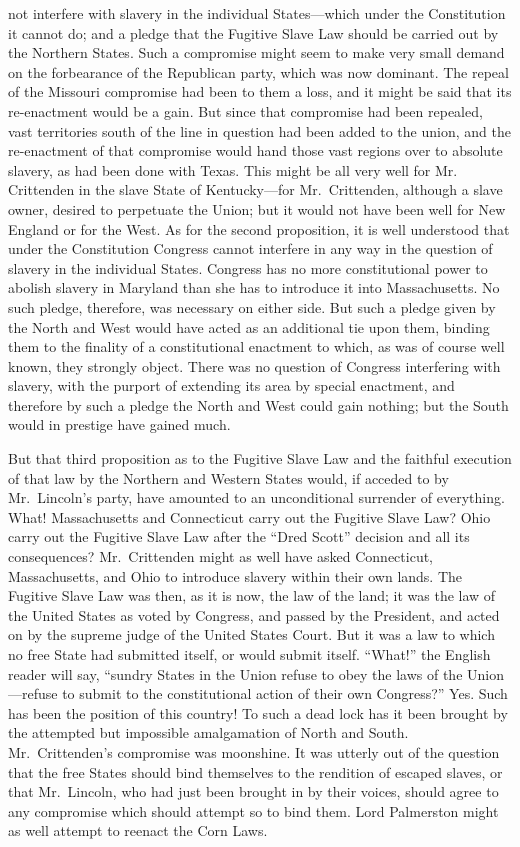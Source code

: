 not interfere with slavery in the individual States---which under
the Constitution it cannot do; and a pledge that the Fugitive Slave
Law should be carried out by the Northern States.  Such a
compromise might seem to make very small demand on the forbearance
of the Republican party, which was now dominant.  The repeal of the
Missouri compromise had been to them a loss, and it might be said
that its re-enactment would be a gain.  But since that compromise
had been repealed, vast territories south of the line in question
had been added to the union, and the re-enactment of that
compromise would hand those vast regions over to absolute slavery,
as had been done with Texas.  This might be all very well for Mr.\ %
Crittenden in the slave State of Kentucky---for Mr.\ Crittenden,
although a slave owner, desired to perpetuate the Union; but it
would not have been well for New England or for the West.  As for
the second proposition, it is well understood that under the
Constitution Congress cannot interfere in any way in the question
of slavery in the individual States.  Congress has no more
constitutional power to abolish slavery in Maryland than she has to
introduce it into Massachusetts.  No such pledge, therefore, was
necessary on either side.  But such a pledge given by the North and
West would have acted as an additional tie upon them, binding them
to the finality of a constitutional enactment to which, as was of
course well known, they strongly object.  There was no question of
Congress interfering with slavery, with the purport of extending
its area by special enactment, and therefore by such a pledge the
North and West could gain nothing; but the South would in prestige
have gained much.

But that third proposition as to the Fugitive Slave Law and the
faithful execution of that law by the Northern and Western States
would, if acceded to by Mr.\ Lincoln's party, have amounted to an
unconditional surrender of everything.  What!  Massachusetts and
Connecticut carry out the Fugitive Slave Law?  Ohio carry out the
Fugitive Slave Law after the ``Dred Scott'' decision and all its
consequences?  Mr.\ Crittenden might as well have asked Connecticut,
Massachusetts, and Ohio to introduce slavery within their own
lands.  The Fugitive Slave Law was then, as it is now, the law of
the land; it was the law of the United States as voted by Congress,
and passed by the President, and acted on by the supreme judge of
the United States Court.  But it was a law to which no free State
had submitted itself, or would submit itself.  ``What!'' the English
reader will say, ``sundry States in the Union refuse to obey the
laws of the Union---refuse to submit to the constitutional action of
their own Congress?''  Yes.  Such has been the position of this
country!  To such a dead lock has it been brought by the attempted
but impossible amalgamation of North and South.  Mr.\ Crittenden's
compromise was moonshine.  It was utterly out of the question that
the free States should bind themselves to the rendition of escaped
slaves, or that Mr.\ Lincoln, who had just been brought in by their
voices, should agree to any compromise which should attempt so to
bind them.  Lord Palmerston might as well attempt to reenact the
Corn Laws.

